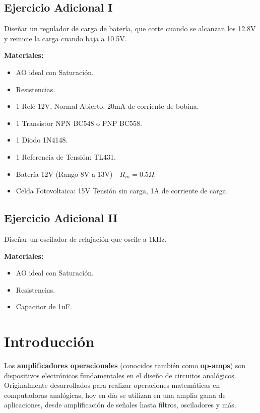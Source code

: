 \subsection{Ejercicio Adicional I}
Diseñar un regulador de carga de batería, que corte cuando se alcanzan los 12.8V y reinicie la
carga cuando baja a 10.5V.\\
\begin{center}
    \textbf{Materiales:}\\
\end{center}
    \begin{itemize}
        \item AO ideal con Saturación.
        \item Resistencias.
        \item 1 Relé 12V, Normal Abierto, 20mA de corriente de bobina.
        \item 1 Transistor NPN BC548 o PNP BC558.
        \item 1 Diodo 1N4148.
        \item 1 Referencia de Tensión: TL431.
        \item Batería 12V (Rango 8V a 13V) - $R_{in} = 0.5 \Omega$.
        \item Celda Fotovoltaica: 15V Tensión sin carga, 1A de corriente de carga.
    \end{itemize}
    
\subsection{Ejercicio Adicional II}
Diseñar un oscilador de relajación que oscile a 1kHz.\\
\begin{center}
    \textbf{Materiales:}\\
\end{center}
    \begin{itemize}
        \item AO ideal con Saturación.
        \item Resistencias.
        \item Capacitor de 1uF.
    \end{itemize}
\newpage

\section{Introducción}
Los \textbf{amplificadores operacionales} (conocidos también como \textbf{op-amps}) son dispositivos electrónicos fundamentales en el diseño de circuitos analógicos. Originalmente desarrollados para realizar operaciones matemáticas en computadoras analógicas, hoy en día se utilizan en una amplia gama de aplicaciones, desde amplificación de señales hasta filtros, osciladores y más.\\

